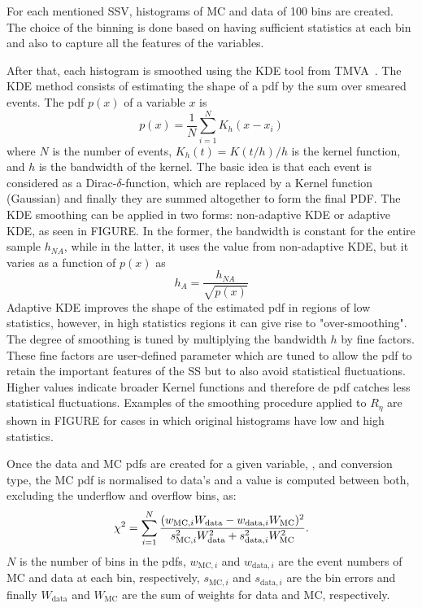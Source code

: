 For each mentioned \ac{SSV}, histograms of \ac{MC} and data of 100 bins are created. The choice of the binning is done based on having sufficient statistics at each bin and also to capture all the features of the variables.

After that, each histogram is smoothed using the \ac{KDE} tool from TMVA~\cite{TMVA}. The \ac{KDE} method consists of estimating the shape of a \ac{pdf} by the sum over smeared events. The \ac{pdf} \(p(x)\) of a variable \(x\) is
\begin{equation}
	p(x) = \frac{1}{N}\sum_{i=1}^{N} K_h(x-x_i)
\end{equation}
where \(N\) is the number of events, \(K_h(t) = K(t/h)/h\) is the kernel function, and \(h\) is the bandwidth of the kernel. The basic idea is that each event is considered as a Dirac-\(\delta\)-function, which are replaced by a Kernel function (Gaussian) and finally they are summed altogether to form the final \ac{PDF}. The \ac{KDE} smoothing can be applied in two forms: non-adaptive \ac{KDE} or adaptive \ac{KDE}, as seen in FIGURE. In the former, the bandwidth is constant for the entire sample \(h_{NA}\), while in the latter, it uses the value from non-adaptive \ac{KDE}, but it varies as a function of \(p(x)\) as
\begin{equation}
	h_A = \frac{h_{NA}}{\sqrt{p(x)}}
\end{equation}
Adaptive \ac{KDE} improves the shape of the estimated \ac{pdf} in regions of low statistics, however, in high statistics regions it can give rise to "over-smoothing". The degree of smoothing is tuned by multiplying the bandwidth \(h\) by fine factors. 
These fine factors are user-defined parameter which are tuned to allow the \ac{pdf} to retain the important features of the \ac{SS} but to also avoid statistical fluctuations. Higher values indicate broader Kernel functions and therefore de \ac{pdf} catches less statistical fluctuations.
Examples of the smoothing procedure applied to \(R_{\eta}\) are shown in FIGURE for cases in which original histograms have low and high statistics.




Once the data and \ac{MC} \acp{pdf} are created for a given variable, \pt, \abseta and conversion type, the \ac{MC} \ac{pdf} is normalised to data's and a \chisq value is computed between both, excluding the underflow and overflow bins, as:
\begin{equation}
	\chi^{2} = \sum_{i=1}^{N} \dfrac{(w_{\text{MC},i} W_{\text{data}} - w_{\text{data},i} W_{\text{MC}})^2}{s_{\text{MC},i}^2 W_{\text{data}}^2 + s_{\text{data},i}^2 W_{\text{MC}}^2}.
\end{equation}
\(N\) is the number of bins in the \acp{pdf}, \(w_{\text{MC},i}\) and \(w_{\text{data},i}\) are the event numbers of \ac{MC} and data at each bin, respectively, \(s_{\text{MC},i}\) and \(s_{\text{data},i}\) are the bin errors and finally \(W_{\text{data}}\) and \(W_{\text{MC}}\) are the sum of weights for data and \ac{MC}, respectively.

